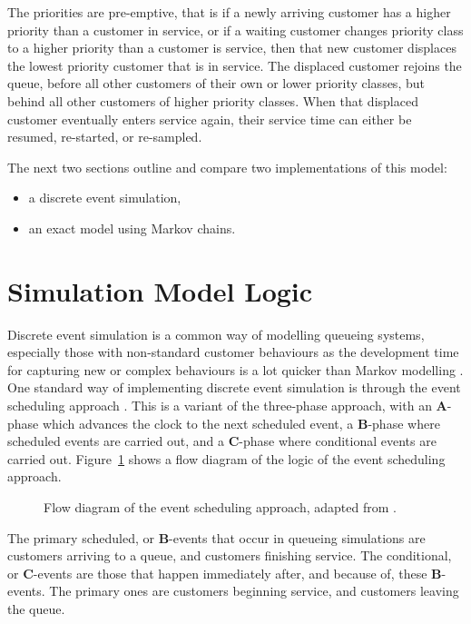 \documentclass{article}
\begin{document}
The priorities are pre-emptive, that is if a newly arriving customer has a
higher priority than a customer in service, or if a waiting customer changes
priority class to a higher priority than a customer is service, then that new
customer displaces the lowest priority customer that is in service. The
displaced customer rejoins the queue, before all other customers of their own or
lower priority classes, but behind all other customers of higher priority
classes. When that displaced customer eventually enters service again, their
service time can either be resumed, re-started, or re-sampled.

The next two sections outline and compare two implementations of this model:

\begin{itemize}
    \item a discrete event simulation,
    \item an exact model using Markov chains.
\end{itemize}



\section{Simulation Model Logic}\label{sec:simulation}
Discrete event simulation is a common way of modelling queueing systems,
especially those with non-standard customer behaviours as the development time
for capturing new or complex behaviours is a lot quicker than Markov modelling
\cite{standfield14}.
One standard way of implementing discrete event simulation is through the event
scheduling approach \cite{robinson14}. This is a variant of the three-phase
approach, with an \textbf{A}-phase which advances the clock to the next
scheduled event, a \textbf{B}-phase where scheduled events are carried out, and
a \textbf{C}-phase where conditional events are carried out.
Figure~\ref{fig:eventscheduling} shows a flow diagram of the logic of the event
scheduling approach.

\begin{figure}
    \centering
    
    \caption{Flow diagram of the event scheduling approach, adapted from
    \cite{palmer18}.}
    \label{fig:eventscheduling}
\end{figure}

The primary scheduled, or \textbf{B}-events that occur in queueing simulations
are customers arriving to a queue, and customers finishing service.
The conditional, or \textbf{C}-events are those that happen immediately after,
and because of, these \textbf{B}-events. The primary ones are customers
beginning service, and customers leaving the queue.
\end{document}
